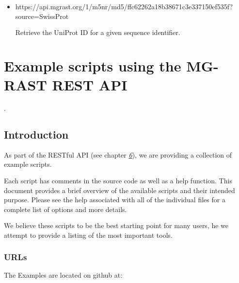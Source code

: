 \documentclass[letterpaper,10pt,english]{sphinxmanual}
\begin{document}
\begin{itemize}
Retrieve a set of lists of all our controlled metadata terms,
including the ontologies.

\begin{sphinxVerbatim}[commandchars=\\\{\}]
https://api.mg\PYGZhy{}rast.org/metadata/ontology?name=biome\PYGZam{}version=2013\PYGZhy{}04\PYGZhy{}27
\end{sphinxVerbatim}

Retrieve a more detailed list (with relationships) for a specific
version of the ontology.

\item {} 

\begin{sphinxVerbatim}[commandchars=\\\{\}]
https://api.mg\PYGZhy{}rast.org/1/m5nr/md5/ffc62262a18b38671c3e337150ef535f?source=SwissProt
\end{sphinxVerbatim}

Retrieve the UniProt ID for a given sequence identifier.

\end{itemize}


\chapter{Example scripts using the MG-RAST REST API}
\label{\detokenize{api:example-scripts-using-the-mg-rast-rest-api}}\label{\detokenize{api:api-examples}}
.


\section{Introduction}
\label{\detokenize{api:introduction-2}}\label{\detokenize{api:id1}}
As part of the RESTful API (see chapter {\hyperref[\detokenize{api:API}]{\emph{6}}}), we are providing
a collection of example scripts.

Each script has comments in the source code as well as a help function.
This document provides a brief overview of the available scripts and
their intended purpose. Please see the help associated with all of the
individual files for a complete list of options and more details.

We believe these scripts to be the best starting point for many users,
he we attempt to provide a listing of the most important tools.


\subsection{URLs}
\label{\detokenize{api:urls-1}}\label{\detokenize{api:id2}}
The Examples are located on github at:
\end{document}
